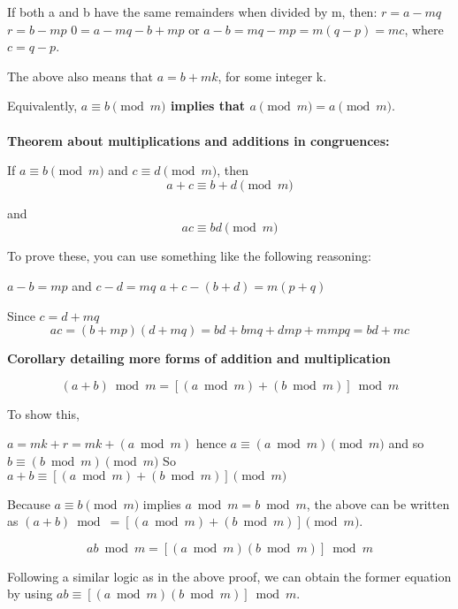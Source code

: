 If both a and b have the same remainders when divided by m, then:
$r = a - mq$ 
$r = b - mp$
$0 = a - mq - b + mp$ or $a - b = mq - mp = m(q-p) = mc$, where $c = q-p$.

The above also means that $a = b + mk$, for some integer k.

Equivalently, \textbf{$a \equiv b \pmod m$ implies that $a \pmod m = a \pmod m$}.
\\~\\

\textbf{Theorem about multiplications and additions in congruences:}

If $a \equiv b \pmod m$ and $c \equiv d \pmod m$, then
\begin{equation}
    a + c \equiv b + d \pmod m
\end{equation}

and
\begin{equation}
    ac \equiv bd \pmod m
\end{equation}

To prove these, you can use something like the following reasoning:

$a - b = mp$ and $c - d = mq$
$a + c - (b + d) = m(p+q)$

Since $c = d + mq$
$$
ac = (b + mp)(d + mq) = bd + bmq + dmp + mmpq = bd + mc
$$

\textbf{Corollary detailing more forms of addition and multiplication}

\begin{equation}
    (a+b) \bmod m = [(a \bmod m) + (b \bmod m)] \bmod m
\end{equation}

To show this,

$a = mk + r = mk + (a \bmod m)$ hence
$a \equiv (a \bmod m) \pmod m$ and so $b \equiv (b \bmod m) \pmod m$
So $a + b \equiv [(a \bmod m) + (b \bmod m)] \pmod m$

Because $a \equiv b \pmod m$ implies $a \bmod m = b \bmod m$, the above can be written as
$(a+b) \bmod = [(a \bmod m) + (b \bmod m)] \pmod m$.

\begin{equation}
    ab \bmod m = [(a \bmod m)(b \bmod m)] \bmod m
\end{equation}

Following a similar logic as in the above proof, we can obtain the former equation by using $ab \equiv [(a \bmod m)(b \bmod m)] \bmod m$.
